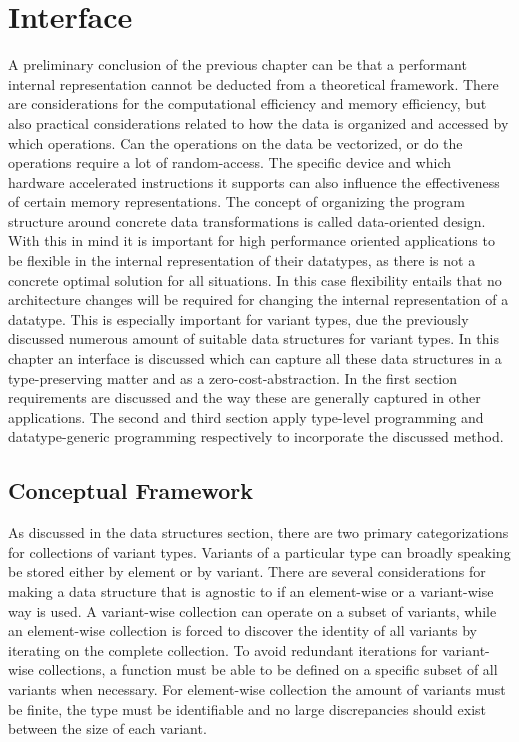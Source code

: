 \documentclass{article}
\begin{document}
\newpage

\section{Interface}

A preliminary conclusion of the previous chapter can be that a performant internal representation cannot be deducted from a theoretical framework.
There are considerations for the computational efficiency and memory efficiency, but also practical considerations related to how the data is organized and accessed by which operations.
Can the operations on the data be vectorized, or do the operations require a lot of random-access.
The specific device and which hardware accelerated instructions it supports can also influence the effectiveness of certain memory representations.
The concept of organizing the program structure around concrete data transformations is called data-oriented design.
With this in mind it is important for high performance oriented applications to be flexible in the internal representation of their datatypes, as there is not a concrete optimal solution for all situations.
In this case flexibility entails that no architecture changes will be required for changing the internal representation of a datatype.
This is especially important for variant types, due the previously discussed numerous amount of suitable data structures for variant types.
In this chapter an interface is discussed which can capture all these data structures in a type-preserving matter and as a zero-cost-abstraction. 
In the first section requirements are discussed and the way these are generally captured in other applications.
The second and third section apply type-level programming and datatype-generic programming respectively to incorporate the discussed method.

\subsection{Conceptual Framework}

As discussed in the data structures section, there are two primary categorizations for collections of variant types.
Variants of a particular type can broadly speaking be stored either by element or by variant.
There are several considerations for making a data structure that is agnostic to if an element-wise or a variant-wise way is used.
A variant-wise collection can operate on a subset of variants, while an element-wise collection is forced to discover the identity of all variants by iterating on the complete collection.
To avoid redundant iterations for variant-wise collections, a function must be able to be defined on a specific subset of all variants when necessary.
For element-wise collection the amount of variants must be finite, the type must be identifiable and no large discrepancies should exist between the size of each variant.
\end{document}
